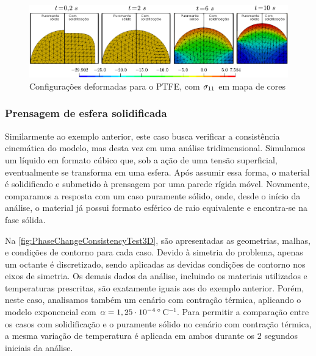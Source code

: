 \documentclass[Tese.tex]{subfiles}
\begin{document}
\begin{figure}[!htb]
	\centering
	\caption{Configurações deformadas para o PTFE, com ${\sigma}_{11}$ em mapa de cores}
	\label{fig:PhaseChangeConsistencyTest2D-PTFE}
	\includegraphics[width=\textwidth]{Figuras/PhaseChangeConsistencyTest2D/PTFE.png}
\end{figure}



\subsubsection{Prensagem de esfera solidificada}

Similarmente ao exemplo anterior, este caso busca verificar a consistência cinemática do modelo, mas desta vez em uma análise tridimensional. Simulamos um líquido em formato cúbico que, sob a ação de uma tensão superficial, eventualmente se transforma em uma esfera. Após assumir essa forma, o material é solidificado e submetido à prensagem por uma parede rígida móvel. Novamente, comparamos a resposta com um caso puramente sólido, onde, desde o início da análise, o material já possui formato esférico de raio equivalente e encontra-se na fase sólida.

Na \cref{fig:PhaseChangeConsistencyTest3D}, são apresentadas as geometrias, malhas, e condições de contorno para cada caso. Devido à simetria do problema, apenas um octante é discretizado, sendo aplicadas as devidas condições de contorno nos eixos de simetria. Os demais dados da análise, incluindo os materiais utilizados e temperaturas prescritas, são exatamente iguais aos do exemplo anterior. Porém, neste caso, analisamos também um cenário com contração térmica, aplicando o modelo exponencial com $\alpha = 1,25\cdot 10^{-4}\,^{\circ}$C$^{-1}$. Para permitir a comparação entre os casos com solidificação e o puramente sólido no cenário com contração térmica, a mesma variação de temperatura é aplicada em ambos durante os $2$ segundos iniciais da análise.
\end{document}
